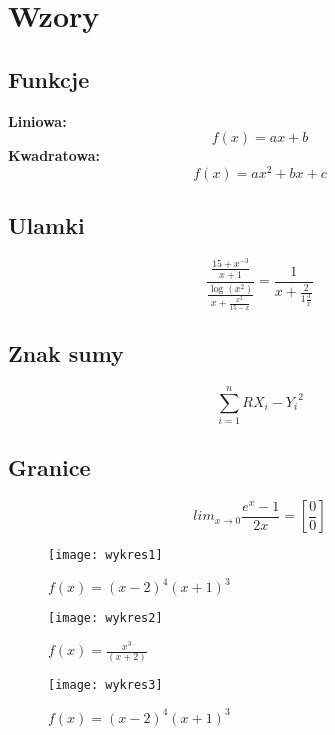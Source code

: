 \section{Wzory}

\subsection{Funkcje}

    \textbf{Liniowa:} $$f(x)=ax+b$$
    \textbf{Kwadratowa:} $$f(x)=ax^2+bx+c$$

\subsection{Ulamki}

    $$\frac{ \frac{15+x^{-3}}{x+1} }
    {\frac{\log(x^2)}{x+
    \frac{x^2}{15-x}}} =
    \frac{1}{x+ \frac{2}{1\frac{3}{x}}}$$

\subsection{Znak sumy}

    $$\sum_{i=1}^n{RX_i-Y_i}^2$$

\subsection{Granice}

    $$lim_{x\to 0}{\frac{e^x-1}{2x}}
    ={\left[\frac{0}{0}\right]}$$

\begin{figure}
    \texttt{[image: wykres1]}
    \caption{$f(x)=(x-2)^4(x+1)^3$}
\end{figure}

\begin{figure}
    \centering
    \texttt{[image: wykres2]}
    \caption{$f(x)=\frac{x^3}{(x+2)}$}
\end{figure}
\begin{figure}
    \texttt{[image: wykres3]}
    \caption{$f(x)=(x-2)^4(x+1)^3$}
\end{figure}